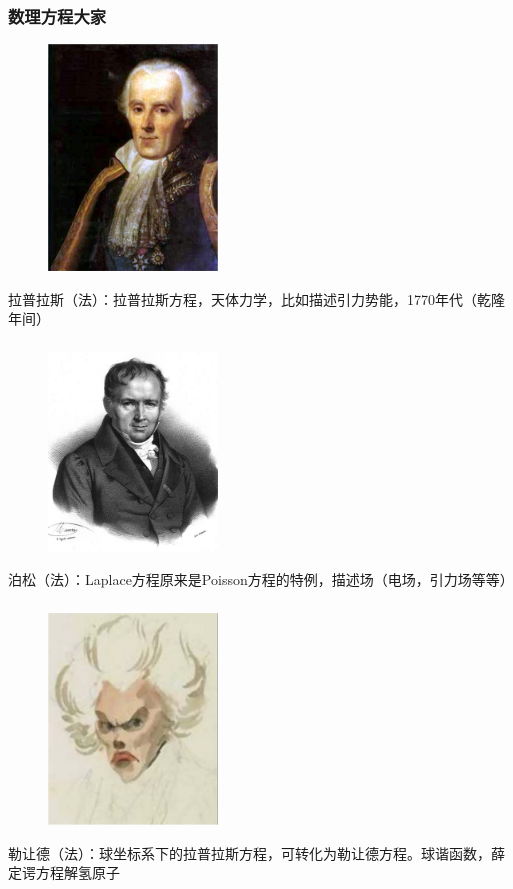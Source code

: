 \begin{frame}
	\frametitle{数理方程大家}
	\begin{center}
		\begin{figure}
			\includegraphics[width=4.5cm]{figs/fig1-3-1.png}	
		\end{figure}
	\end{center}
	{拉普拉斯（法）：拉普拉斯方程，天体力学，比如描述引力势能，1770年代（乾隆年间）}
\end{frame}

\begin{frame}
	\frametitle{}
	\begin{center}
		\begin{figure}
			\includegraphics[width=4.5cm]{figs/fig1-3-4.png}	
		\end{figure}
	\end{center}
		{泊松（法）：Laplace方程原来是Poisson方程的特例，描述场（电场，引力场等等）}
\end{frame}

\begin{frame}
	\frametitle{}
	\begin{center}
		\begin{figure}
			\includegraphics[width=4.5cm]{figs/fig1-3-5.png}	
		\end{figure}
	\end{center}
		{勒让德（法）：球坐标系下的拉普拉斯方程，可转化为勒让德方程。球谐函数，薛定谔方程解氢原子}
\end{frame}

